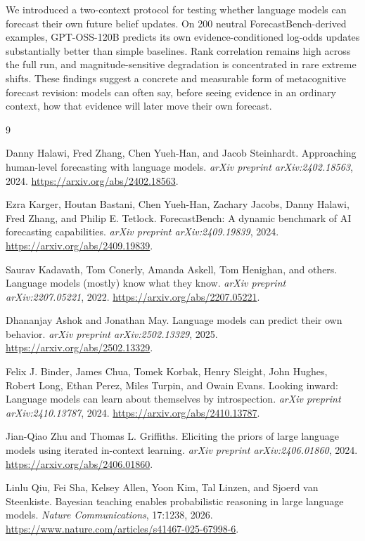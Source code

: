 \documentclass[11pt]{article}
\begin{document}
We introduced a two-context protocol for testing whether language models can
forecast their own future belief updates. On 200 neutral ForecastBench-derived
examples, GPT-OSS-120B predicts its own evidence-conditioned log-odds updates
substantially better than simple baselines. Rank correlation remains high across
the full run, and magnitude-sensitive degradation is concentrated in rare
extreme shifts. These findings suggest a concrete and measurable form of
metacognitive forecast revision: models can often say, before seeing evidence
in an ordinary context, how that evidence will later move their own forecast.

\begin{thebibliography}{9}

Danny Halawi, Fred Zhang, Chen Yueh-Han, and Jacob Steinhardt.
\newblock Approaching human-level forecasting with language models.
\newblock \emph{arXiv preprint arXiv:2402.18563}, 2024.
\newblock \url{https://arxiv.org/abs/2402.18563}.

Ezra Karger, Houtan Bastani, Chen Yueh-Han, Zachary Jacobs, Danny Halawi,
Fred Zhang, and Philip E. Tetlock.
\newblock ForecastBench: A dynamic benchmark of AI forecasting capabilities.
\newblock \emph{arXiv preprint arXiv:2409.19839}, 2024.
\newblock \url{https://arxiv.org/abs/2409.19839}.

Saurav Kadavath, Tom Conerly, Amanda Askell, Tom Henighan, and others.
\newblock Language models (mostly) know what they know.
\newblock \emph{arXiv preprint arXiv:2207.05221}, 2022.
\newblock \url{https://arxiv.org/abs/2207.05221}.

Dhananjay Ashok and Jonathan May.
\newblock Language models can predict their own behavior.
\newblock \emph{arXiv preprint arXiv:2502.13329}, 2025.
\newblock \url{https://arxiv.org/abs/2502.13329}.

Felix J. Binder, James Chua, Tomek Korbak, Henry Sleight, John Hughes,
Robert Long, Ethan Perez, Miles Turpin, and Owain Evans.
\newblock Looking inward: Language models can learn about themselves by
introspection.
\newblock \emph{arXiv preprint arXiv:2410.13787}, 2024.
\newblock \url{https://arxiv.org/abs/2410.13787}.

Jian-Qiao Zhu and Thomas L. Griffiths.
\newblock Eliciting the priors of large language models using iterated
in-context learning.
\newblock \emph{arXiv preprint arXiv:2406.01860}, 2024.
\newblock \url{https://arxiv.org/abs/2406.01860}.

Linlu Qiu, Fei Sha, Kelsey Allen, Yoon Kim, Tal Linzen, and Sjoerd van
Steenkiste.
\newblock Bayesian teaching enables probabilistic reasoning in large language
models.
\newblock \emph{Nature Communications}, 17:1238, 2026.
\newblock \url{https://www.nature.com/articles/s41467-025-67998-6}.

\end{thebibliography}
\end{document}
